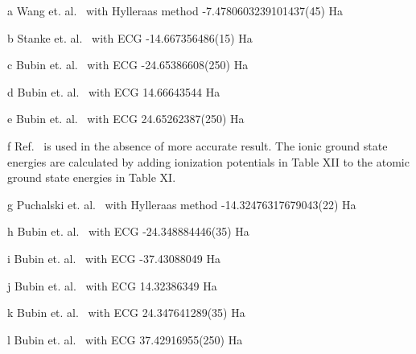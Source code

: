 \begin{table*}[t!]
\begin{threeparttable}
\begin{tablenotes}
\item[a] Wang et. al.~\cite{Wang_Li} with Hylleraas method -7.4780603239101437(45) Ha
\item[b] Stanke et. al.~\cite{Stanke_Be} with ECG -14.667356486(15) Ha
\item[c] Bubin et. al.~\cite{Bubin_B} with ECG -24.65386608(250) Ha
\item[d] Bubin et. al.~\cite{Bubin_BeH_noBO} with ECG \text{-}14.66643544 Ha
\item[e] Bubin et. al.~\cite{Bubin_B} with ECG \text{-}24.65262387(250) Ha
\item[f] Ref.~\cite{Davidson_Atoms} is used in the absence of more accurate result. The ionic ground state energies are calculated by adding ionization potentials in Table XII to the atomic ground state energies in Table XI.
\item[g] Puchalski et. al.~\cite{Puchalski_Be+} with Hylleraas method -14.32476317679043(22) Ha
\item[h] Bubin et. al.~\cite{Bubin_B+} with ECG -24.348884446(35) Ha
\item[i] Bubin et. al.~\cite{Bubin_C+} with ECG -37.43088049 Ha
\item[j] Bubin et. al.~\cite{Bubin_BeH_noBO} with ECG \text{-}14.32386349 Ha
\item[k] Bubin et. al.~\cite{Bubin_B+} with ECG \text{-}24.347641289(35) Ha
\item[l] Bubin et. al.~\cite{Bubin_C+} with ECG \text{-}37.42916955(250) Ha
\end{tablenotes}

\end{threeparttable}
\end{table*}
